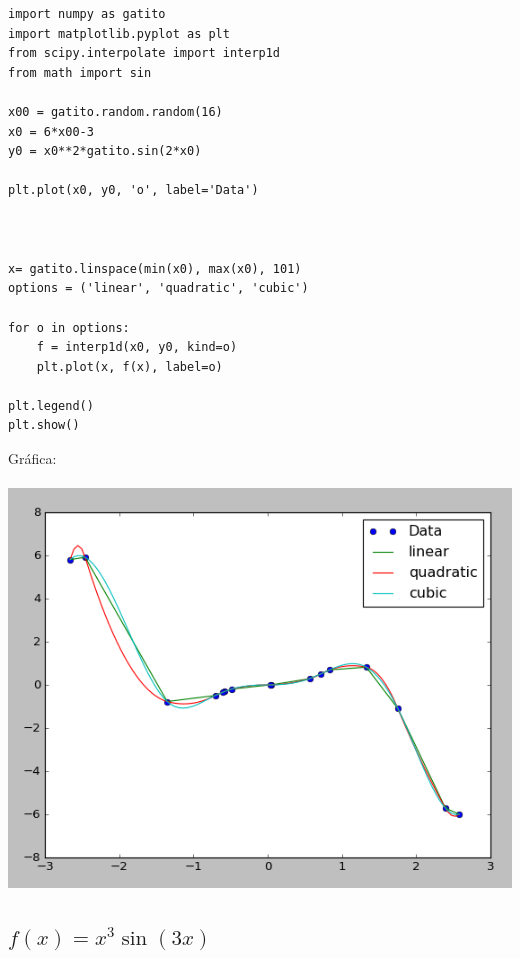 \documentclass[12pt,letterpaper]{article}
\begin{document}
\begin{verbatim}
import numpy as gatito
import matplotlib.pyplot as plt
from scipy.interpolate import interp1d
from math import sin

x00 = gatito.random.random(16)
x0 = 6*x00-3
y0 = x0**2*gatito.sin(2*x0)

plt.plot(x0, y0, 'o', label='Data')



x= gatito.linspace(min(x0), max(x0), 101)
options = ('linear', 'quadratic', 'cubic')

for o in options: 
    f = interp1d(x0, y0, kind=o)
    plt.plot(x, f(x), label=o)
    
plt.legend()
plt.show()

\end{verbatim}
Gráfica:\\
\\
\includegraphics[scale=.5]{grafica3act3.png}

\subsection{$f(x) = x^3 \sin(3x)$}
\end{document}
